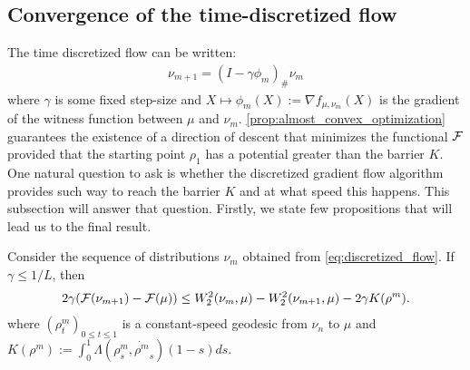 

\subsection{Convergence of the time-discretized flow}

The time discretized flow can be written:
\begin{align}\label{eq:discretized_flow}
\nu_{m+1} = (I -\gamma \phi_m)_{\#}\nu_m
\end{align}
where $\gamma$ is some fixed step-size and $X \mapsto \phi_m(X):=\nabla f_{\mu, \nu_m}(X)$ is the gradient of the witness function between $\mu$ and $\nu_m$.%
\cref{prop:almost_convex_optimization} guarantees the existence of a direction of descent that minimizes the functional ${{\mathcal F}}$ provided that the starting point $\rho_1$ has a potential greater than the barrier $K$.%
One natural question to ask is whether the  discretized gradient flow algorithm provides such way to reach the barrier $K$ and at what speed this happens. This subsection will answer that question. Firstly, we state few propositions that will lead us to the final result.



\begin{proposition}\label{prop:evi}
	Consider the sequence of distributions $\nu_m$ obtained from \cref{eq:discretized_flow}. If $\gamma \leq 1/L$, then
	\begin{align}
2\gamma({{\mathcal F}}(\nu_{m+1})-{{\mathcal F}}(\mu))
\leq 
W_2^2(\nu_m,\mu)-W_2^2(\nu_{m+1},\mu)-2\gamma K(\rho^m).
\label{eq:evi}
\end{align}
where $(\rho^m_t)_{0\leq t \leq 1}$ is a constant-speed geodesic from $\nu_n$ to $\mu$ and $K(\rho^m):=\int_0^1 \Lambda(\rho^m_s,\dot{\rho^m}_s)(1-s)ds$.
\end{proposition}

